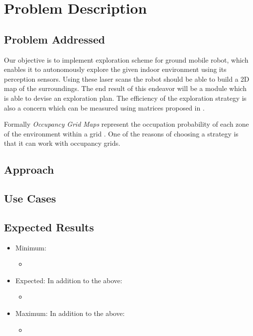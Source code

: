 \section{Problem Description}

\subsection{Problem Addressed}
Our objective is to implement exploration scheme for ground mobile robot, which enables it to
autonomously explore the given indoor environment using its perception sensors.
Using these laser scans the robot should be able to build a 2D map of the surroundings.
The end result of this endeavor will be a module which is able to devise an exploration plan.
The efficiency of the exploration strategy is also a concern which can be measured using matrices
proposed in \cite{Juliae2012}.
\par
Formally \textit{Occupancy Grid Maps} represent the occupation probability of each zone of the
environment within a grid \cite{Juliae2012}. One of the reasons of choosing a strategy is that
it can work with occupancy grids.

\subsection{Approach}


\subsection{Use Cases}

\subsection{Expected Results}
\begin{itemize}
	\item Minimum:
	\begin{itemize}
		\item
	\end{itemize}
	\item Expected:
	In addition to the above:
	\begin{itemize}
		\item
	\end{itemize}
	\item Maximum:
	In addition to the above:
	\begin{itemize}
		\item
	\end{itemize}
\end{itemize}
